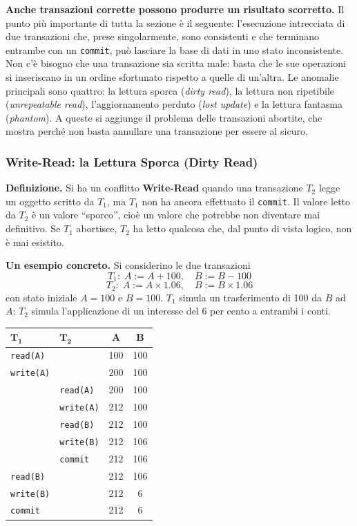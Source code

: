 \documentclass[12pt]{extarticle}
\begin{document}
\noindent \textbf{Anche transazioni corrette possono produrre un risultato scorretto.} Il punto più importante di tutta la sezione è il seguente: l'esecuzione intrecciata di due transazioni che, prese singolarmente, sono consistenti e che terminano entrambe con un \texttt{commit}, può lasciare la base di dati in uno stato inconsistente. Non c'è bisogno che una transazione sia scritta male: basta che le sue operazioni si inseriscano in un ordine sfortunato rispetto a quelle di un'altra. Le anomalie principali sono quattro: la lettura sporca (\textit{dirty read}), la lettura non ripetibile (\textit{unrepeatable read}), l'aggiornamento perduto (\textit{lost update}) e la lettura fantasma (\textit{phantom}). A queste si aggiunge il problema delle transazioni abortite, che mostra perché non basta annullare una transazione per essere al sicuro.

\subsubsection{Write-Read: la Lettura Sporca (Dirty Read)}

\noindent \textbf{Definizione.} Si ha un conflitto \textbf{Write-Read} quando una transazione $T_2$ legge un oggetto scritto da $T_1$, ma $T_1$ non ha ancora effettuato il \texttt{commit}. Il valore letto da $T_2$ è un valore ``sporco'', cioè un valore che potrebbe non diventare mai definitivo. Se $T_1$ abortisce, $T_2$ ha letto qualcosa che, dal punto di vista logico, non è mai esistito.

\medskip
\noindent \textbf{Un esempio concreto.} Si considerino le due transazioni
\[
T_1:\; A:=A+100,\quad B:=B-100
\]
\[
T_2:\; A:=A\times 1.06,\quad B:=B\times 1.06
\]
con stato iniziale $A=100$ e $B=100$. $T_1$ simula un trasferimento di 100 da $B$ ad $A$; $T_2$ simula l'applicazione di un interesse del 6 per cento a entrambi i conti.

\begin{center}
\small
\begin{tabular}{@{}llcc@{}}
    \toprule
    $\boldsymbol{T_1}$ & $\boldsymbol{T_2}$ & $\boldsymbol{A}$ & $\boldsymbol{B}$ \\
    \midrule
    \texttt{read(A)}       &      & 100  & 100  \\
    \texttt{write(A)}      &      & 200  & 100  \\
     & \texttt{read(A)}       & 200  & 100  \\
     & \texttt{write(A)}      & 212  & 100  \\
     & \texttt{read(B)}       & 212  & 100  \\
     & \texttt{write(B)}      & 212  & 106  \\
     & \texttt{commit}        & 212  & 106  \\
    \texttt{read(B)}       &      & 212  & 106  \\
    \texttt{write(B)}      &      & 212  & 6    \\
    \texttt{commit}        &      & 212  & 6    \\
    \bottomrule
\end{tabular}
\end{center}
\end{document}
